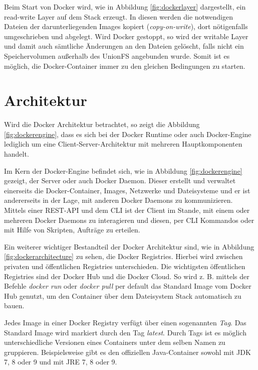 Beim Start von Docker wird, wie in Abbildung \ref{fig:dockerlayer} dargestellt, ein read-write Layer auf dem Stack erzeugt.
In diesen werden die notwendigen Dateien der darunterliegenden Images kopiert (\textit{copy-on-write}), dort nötigenfalls umgeschrieben und abgelegt.
Wird Docker gestoppt, so wird der writable Layer und damit auch sämtliche Änderungen an den Dateien gelöscht, falls nicht ein Speichervolumen außerhalb des \ac{UnionFS} angebunden wurde.
Somit ist es möglich, die Docker-Container immer zu den gleichen Bedingungen zu starten.

\section{Architektur}
\label{c:architektur}

Wird die Docker Architektur betrachtet, so zeigt die Abbildung \ref{fig:dockerengine}, dass es sich bei der Docker Runtime oder auch Docker-Engine lediglich um eine Client-Server-Architektur mit mehreren Hauptkomponenten handelt.

Im Kern der Docker-Engine befindet sich, wie in Abbildung \ref{fig:dockerengine} gezeigt, der Server oder auch Docker Daemon.
Dieser erstellt und verwaltet einerseits die Docker-Container, Images, Netzwerke und Dateisysteme und er ist andererseits in der Lage, mit anderen Docker Daemons zu kommunizieren.
Mittels einer REST-API und dem \ac{CLI} ist der Client im Stande, mit einem oder mehreren Docker Daemons zu interagieren und diesen, per \ac{CLI} Kommandos oder mit Hilfe von Skripten, Aufträge zu erteilen.

Ein weiterer wichtiger Bestandteil der Docker Architektur sind, wie in Abbildung \ref{fig:dockerarchitecture} zu sehen, die Docker Registries.
Hierbei wird zwischen privaten und öffentlichen Registries unterschieden.
Die wichtigsten öffentlichen Registries sind der Docker Hub und die Docker Cloud.
So wird z. B. mittels der Befehle \textit{docker run} oder \textit{docker pull} per default das Standard Image vom Docker Hub genutzt, um den Container über dem Dateisystem Stack automatisch zu bauen.

Jedes Image in einer Docker Registry verfügt über einen sogenannten \textit{Tag}.
Das Standard Image wird markiert durch den Tag \textit{latest}.
Durch Tags ist es möglich unterschiedliche Versionen eines Containers unter dem selben Namen zu gruppieren.
Beispielsweise gibt es den offiziellen Java-Container sowohl mit JDK 7, 8 oder 9 und mit JRE 7, 8 oder 9.

